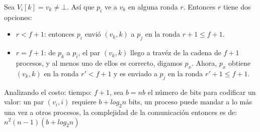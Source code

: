 \documentclass{article}
\begin{document}
\begin{enumerate}
{\begin{itemize}
{        Sea  $V_{i}[k] = v_{k} \neq \bot$. Así que $p_{i}$ ve a $v_{k}$ en alguna
        ronda $r$. Entonces $r$ tiene dos opciones:
        \begin{itemize}
          \item {$r < f + 1$: entonces $p_{i}$ envió $(v_{k}, k)$ a $p_{j}$ en
          la ronda $r + 1 \leqslant f + 1$. }
          \item {$r = f + 1$: de $p_{k}$ a $p_{i}$, el par $(v_{k}, k)$ llego a travéz
          de la cadena de $f + 1$ procesos, y al menos uno de ellos es correcto,
          digamos $p_{x}$. Ahora, $p_{x}$ obtiene $(v_{k}, k)$ en la ronda $r' < f + 1$
          y es enviado a $p_{j}$ en la ronda $r' + 1 \leqslant f + 1$.}
        \end{itemize}
        }
      \end{itemize}
      Analizando el costo: tiempo: $f + 1$, sea $b = nb$ el número de bits para
      codificar un valor: un par $(v_{i}, i)$ requiere $b + log_{2}n$ bits, un
      proceso puede mandar a lo más una vez a otros procesos, la complejidad de
      la comunicación entonces es de:\\
      $n^{2}(n - 1)(b + log_{2}n)$


    }
\end{enumerate}
\end{document}
